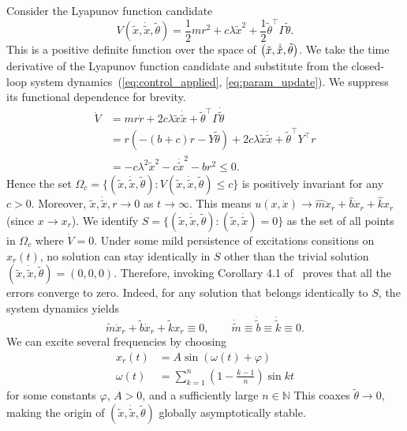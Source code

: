 Consider the Lyapunov function candidate
%
\begin{equation*}
    V(\tilde{x}, \dot{\tilde{x}}, \tilde{\theta}) = \frac{1}{2}mr^2 + 
    c\lambda\tilde{x}^2 + \frac{1}{2}\tilde{\theta}^\top\Gamma\tilde{\theta}.
\end{equation*}
%
This is a positive definite function over the space of $\begin{pmatrix}\tilde{x},
\dot{\tilde{x}}, \tilde{\theta}\end{pmatrix}$. We take the time derivative of the Lyapunov
function candidate and substitute from the closed-loop system
dynamics~(\ref{eq:control_applied}, \ref{eq:param_update}). We suppress its
functional dependence for brevity.
%
\begin{align*}
    \dot{V} &= mr\dot{r} + 2c\lambda \tilde{x}\dot{\tilde{x}} +
    \tilde{\theta}^\top\Gamma\dot{\tilde{\theta}} \\
            &= r\left(-(b+c)r - Y\tilde{\theta}\right) + 2c\lambda
            \tilde{x}\dot{\tilde{x}} + \tilde{\theta}^\top Y^\top r \\
            &= -c\lambda^2\tilde{x}^2 - c\dot{\tilde{x}}^2 - br^2 \leq 0.
\end{align*}
%
Hence the set $\Omega_c = \{(\tilde{x}, \dot{\tilde{x}}, \tilde{\theta}):
V(\tilde{x}, \dot{\tilde{x}}, \tilde{\theta}) \leq c \}$ is positively
invariant for any $c > 0$. Moreover, $\tilde{x}, \dot{\tilde{x}}, r \rightarrow
0$ as $t \rightarrow \infty$. This means $u(x, \dot{x}) \rightarrow
\hat{m}\ddot{x}_r + \hat{b}\dot{x}_r + \hat{k}x_r$ (since $x \rightarrow x_r$).
We identify $S = \{(\tilde{x}, \dot{\tilde{x}}, \tilde{\theta}): (\tilde{x},
\dot{\tilde{x}}) = 0\}$ as the set of all points in $\Omega_c$ where $\dot{V} =
0$. Under some mild persistence of excitations consitions on $x_r(t)$, no
solution can stay identically in $S$ other than the trivial solution
$(\tilde{x}, \dot{\tilde{x}}, \tilde{\theta}) = (0,0,0)$. Therefore, invoking
Corollary 4.1 of~\cite{khalil2015nonlinear} proves that all the errors converge
to zero.
%
Indeed, for any solution that belongs identically to $S$, the system
dynamics yields \[ \tilde{m}\ddot{x}_r + \tilde{b}\dot{x}_r + \tilde{k}x_r
\equiv 0, \qquad \dot{\tilde{m}} \equiv \dot{\tilde{b}} \equiv \dot{\tilde{k}}
\equiv 0. \] 
%
We can excite several frequencies by choosing 
\begin{align*}
    x_r(t) &= A\sin{\left(\omega(t) + \varphi\right)} \\
    \omega(t) &= \sum_{k=1}^n \left(1-\frac{k-1}{n}\right)\sin{k t}
\end{align*}
%
for some constants $\varphi$, $A > 0$, and a sufficiently large $n \in
\mathbb{N}$ This coaxes $\tilde{\theta} \rightarrow 0$, making the origin of
$(\tilde{x}, \dot{\tilde{x}}, \tilde{\theta})$ globally asymptotically stable.
